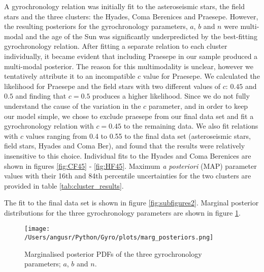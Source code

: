 \documentclass[10pt,preprint]{aastex}
\begin{document}
A gyrochronology relation was initially fit to the asteroseismic stars, the field stars and the three clusters: the Hyades, Coma Berenices and Praesepe.
However, the resulting posteriors for the gyrochronology parameters, $a$, $b$ and $n$ were multi-modal and the age of the Sun was significantly underpredicted by the best-fitting gyrochronology relation.
After fitting a separate relation to each cluster individually, it became evident that including Praesepe in our sample produced a multi-modal posterior.
The reason for this multimodality is unclear, however we tentatively attribute it to an incompatible $c$ value for Praesepe.
We calculated the likelihood for Praesepe and the field stars with two different values of $c$: $0.45$ and $0.5$ and finding that $c=0.5$ produces a higher likelihood.
Since we do not fully understand the cause of the variation in the $c$ parameter, and in order to keep our model simple, we chose to exclude praesepe from our final data set and fit a gyrochronology relation with $c=0.45$ to the remaining data.
We also fit relations with $c$ values ranging from 0.4 to 0.55 to the final data set (asteroseismic stars, field stars, Hyades and Coma Ber), and found that the results were relatively insensitive to this choice.
Individual fits to the Hyades and Coma Berenices are shown in figures \ref{fig:CF45} - \ref{fig:HF45}.
Maximum {\it a posteriori} (MAP) parameter values with their 16th and 84th percentile uncertainties for the two clusters are provided in table \ref{tab:cluster_results}.

The fit to the final data set is shown in figure \ref{fig:subfigures2}.
Marginal posterior distributions for the three gyrochronology parameters are shown in figure \ref{fig:marg_posteriors}.

\begin{figure}[ht]
\begin{center}
\texttt{[image: /Users/angusr/Python/Gyro/plots/marg\_posteriors.png]}
\caption{Marginalised posterior PDFs of the three gyrochronology parameters; $a$, $b$ and $n$.}
\label{fig:marg_posteriors}
\end{center}
\end{figure}
\end{document}
